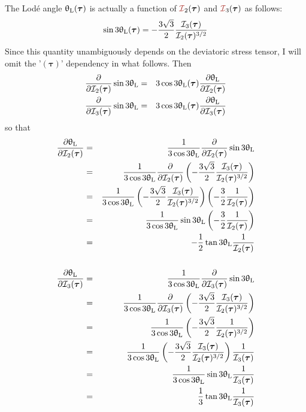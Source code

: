 The Lod\'e angle $\uptheta_{\rm L}(\bm\tau)$ 
is actually a function of ${\III}_2(\bm\tau)$ and ${\III}_3(\bm\tau)$ as follows:
\[
\sin 3\uptheta_{\rm L}(\bm\tau) = 
-\frac{3\sqrt{3}}{2}  \frac{{\cal I}_3(\bm\tau)}{{\cal I}_2(\bm\tau)^{3/2}} 
\]
Since this quantity unambiguously depends on the deviatoric stress tensor, 
I will omit the '$(\bm\tau)$' dependency in what follows.
Then
\begin{eqnarray}
\frac{\partial }{\partial {\cal I}_2(\bm\tau)} \sin 3\uptheta_{\rm L}
&=&3\cos 3\uptheta_{\rm L}(\bm\tau)  \frac{\partial \uptheta_{\rm L}}{\partial {\cal I}_2(\bm\tau)}\nonumber\\
\frac{\partial }{\partial {\cal I}_3(\bm\tau)} \sin 3\uptheta_{\rm L}
&=&3 \cos 3\uptheta_{\rm L}(\bm\tau)  \frac{\partial \uptheta_{\rm L}}{\partial {\cal I}_3(\bm\tau)}\nonumber
\end{eqnarray}
so that 
\begin{eqnarray}
\frac{\partial \uptheta_{\rm L}}{\partial {\cal I}_2(\bm\tau)}
&=&\frac{1}{3 \cos 3\uptheta_{\rm L}} 
\frac{\partial }{\partial {\cal I}_2(\bm\tau)} \sin 3\uptheta_{\rm L}  \nonumber\\
&=&\frac{1}{3 \cos 3\uptheta_{\rm L}} 
\frac{\partial }{\partial {\cal I}_2(\bm\tau)}
\left(-\frac{3\sqrt{3}}{2}  \frac{{\cal I}_3(\bm\tau)}{{\cal I}_2(\bm\tau)^{3/2}} \right) \nonumber\\
&=&\frac{1}{3 \cos 3\uptheta_{\rm L}} 
\left(-\frac{3\sqrt{3}}{2}  \frac{{\cal I}_3(\bm\tau)}{{\cal I}_2(\bm\tau)^{3/2}} \right)
\left( -\frac32 \frac{1}{ {\cal I}_2(\bm\tau)}\right) \nonumber\\
&=&\frac{1}{3 \cos 3\uptheta_{\rm L}} 
\sin 3\uptheta_{\rm L}
\left( -\frac32 \frac{1}{ {\cal I}_2(\bm\tau)}\right) \nonumber\\
&=& -\frac12 \tan 3\uptheta_{\rm L} \frac{1}{ {\cal I}_2(\bm\tau)}  
\nonumber\\
\nonumber\\
\frac{\partial \uptheta_{\rm L}}{\partial {\cal I}_3(\bm\tau)}
&=&\frac{1}{3 \cos 3\uptheta_{\rm L}} 
\frac{\partial }{\partial {\cal I}_3(\bm\tau)} \sin 3\uptheta_{\rm L} \nonumber \\
&=&\frac{1}{3 \cos 3\uptheta_{\rm L}} 
\frac{\partial }{\partial {\cal I}_3(\bm\tau)} 
\left(
-\frac{3\sqrt{3}}{2}  \frac{{\cal I}_3(\bm\tau)}{{\cal I}_2(\bm\tau)^{3/2}} 
\right) \nonumber\\
&=&\frac{1}{3 \cos 3\uptheta_{\rm L}} 
\left(
-\frac{3\sqrt{3}}{2}  \frac{1}{ {\cal I}_2(\bm\tau)^{3/2}} 
\right) \nonumber\\
&=&\frac{1}{3 \cos 3\uptheta_{\rm L}} 
\left(
-\frac{3\sqrt{3}}{2}  \frac{{\cal I}_3(\bm\tau)}{{\cal I}_2(\bm\tau)^{3/2}} 
\right)
\frac{1}{{\cal I}_3(\bm\tau)} \nonumber\\
&=&\frac{1}{3 \cos 3\uptheta_{\rm L}} 
\sin 3 \uptheta_{\rm L}
\frac{1}{{\cal I}_3(\bm\tau)}\nonumber \\
&=& \frac13 \tan 3\uptheta_{\rm L} \frac{1}{{\cal I}_3(\bm\tau)} \nonumber
\end{eqnarray}
